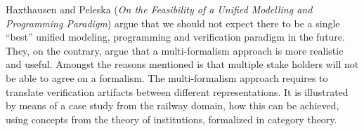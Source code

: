 


Haxthausen and Peleska
\cite{isola-2016-haxthausen}
({\em On the Feasibility of a Unified Modelling and
Programming Paradigm})
argue that we should not expect there to be a single ``best'' 
unified modeling, programming and verification paradigm in the 
future. They, on the contrary, argue that a multi-formalism 
approach is more realistic and useful. Amongst the reasons 
mentioned is that multiple stake holders will not be able to agree 
on a formalism. The multi-formalism approach
requires to translate verification artifacts between different 
representations. It is illustrated
by means of a case study from the railway domain, how this can be
achieved, using concepts from the theory of institutions, formalized in category theory. 



